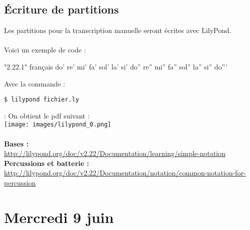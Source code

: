 \documentclass{report}
\begin{document}
	\subsection{Écriture de partitions}
	Les partitions pour la transcription manuelle seront écrites avec LilyPond.\\\\
	Voici un exemple de code :
	\begin{verbatimtab}
	\version "2.22.1"
	\language français
	{
		do' re' mi' fa' sol' la' si' do'' re'' mi'' fa'' sol'' la'' si'' do'''
	}
	\end{verbatimtab}
	Avec la commande :\begin{verbatim}$ lilypond fichier.ly\end{verbatim}:
	On obtient le pdf suivant :\\
	\texttt{[image: images/lilypond\_0.png]}\\\\
	\textbf{Bases :}\\
	\url{http://lilypond.org/doc/v2.22/Documentation/learning/simple-notation}\\
	
	\textbf{Percussions et batterie :}\\
	\url{http://lilypond.org/doc/v2.22/Documentation/notation/common-notation-for-percussion}
	\newpage
	\section{Mercredi 9 juin}
\end{document}
